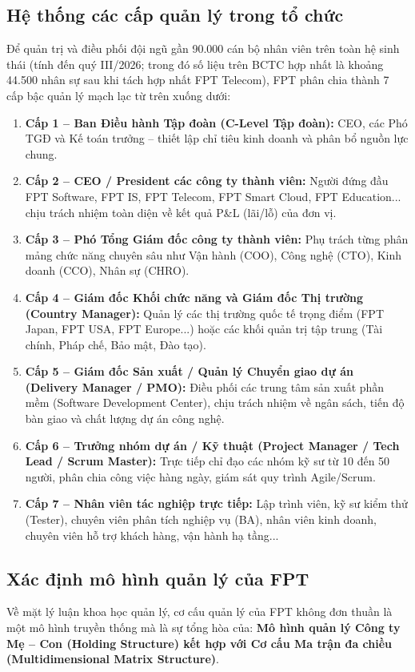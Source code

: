 \subsection{Hệ thống các cấp quản lý trong tổ chức}
Để quản trị và điều phối đội ngũ gần 90.000 cán bộ nhân viên trên toàn hệ sinh thái (tính đến quý III/2026; trong đó số liệu trên BCTC hợp nhất là khoảng 44.500 nhân sự sau khi tách hợp nhất FPT Telecom), FPT phân chia thành 7 cấp bậc quản lý mạch lạc từ trên xuống dưới:
\begin{enumerate}
    \item \textbf{Cấp 1 -- Ban Điều hành Tập đoàn (C-Level Tập đoàn):} CEO, các Phó TGĐ và Kế toán trưởng -- thiết lập chỉ tiêu kinh doanh và phân bổ nguồn lực chung.
    \item \textbf{Cấp 2 -- CEO / President các công ty thành viên:} Người đứng đầu FPT Software, FPT IS, FPT Telecom, FPT Smart Cloud, FPT Education... chịu trách nhiệm toàn diện về kết quả P\&L (lãi/lỗ) của đơn vị.
    \item \textbf{Cấp 3 -- Phó Tổng Giám đốc công ty thành viên:} Phụ trách từng phân mảng chức năng chuyên sâu như Vận hành (COO), Công nghệ (CTO), Kinh doanh (CCO), Nhân sự (CHRO).
    \item \textbf{Cấp 4 -- Giám đốc Khối chức năng và Giám đốc Thị trường (Country Manager):} Quản lý các thị trường quốc tế trọng điểm (FPT Japan, FPT USA, FPT Europe...) hoặc các khối quản trị tập trung (Tài chính, Pháp chế, Bảo mật, Đào tạo).
    \item \textbf{Cấp 5 -- Giám đốc Sản xuất / Quản lý Chuyển giao dự án (Delivery Manager / PMO):} Điều phối các trung tâm sản xuất phần mềm (Software Development Center), chịu trách nhiệm về ngân sách, tiến độ bàn giao và chất lượng dự án công nghệ.
    \item \textbf{Cấp 6 -- Trưởng nhóm dự án / Kỹ thuật (Project Manager / Tech Lead / Scrum Master):} Trực tiếp chỉ đạo các nhóm kỹ sư từ 10 đến 50 người, phân chia công việc hàng ngày, giám sát quy trình Agile/Scrum.
    \item \textbf{Cấp 7 -- Nhân viên tác nghiệp trực tiếp:} Lập trình viên, kỹ sư kiểm thử (Tester), chuyên viên phân tích nghiệp vụ (BA), nhân viên kinh doanh, chuyên viên hỗ trợ khách hàng, vận hành hạ tầng...
\end{enumerate}

\subsection{Xác định mô hình quản lý của FPT}
Về mặt lý luận khoa học quản lý, cơ cấu quản lý của FPT không đơn thuần là một mô hình truyền thống mà là sự tổng hòa của: \textbf{Mô hình quản lý Công ty Mẹ -- Con (Holding Structure) kết hợp với Cơ cấu Ma trận đa chiều (Multidimensional Matrix Structure)}.

